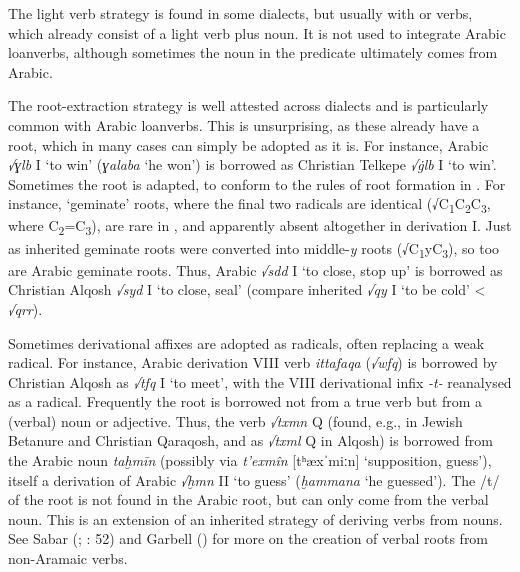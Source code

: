 \documentclass[output=paper]{langsci/langscibook}
\begin{document}
The {light verb} strategy is found in some  dialects, but usually with  or  verbs, which already consist of a {light verb} plus noun. It is not used to integrate Arabic loanverbs, although sometimes the noun in the predicate ultimately comes from Arabic.

The root-extraction strategy is well attested across  dialects and is particularly common with Arabic loanverbs. This is unsurprising, as these already have a {root}, which in many cases can simply be adopted as it is. For instance, Arabic \textit{√ɣlb} I ‘to win’ (\textit{ɣalaba} ‘he won’) is borrowed as Christian Telkepe \textit{√\.glb} I ‘to win’. Sometimes the {root} is adapted, to conform to the rules of {root} {formation} in . For instance, ‘geminate’ {roots}, where the final two radicals are identical (√C\textsubscript{1}C\textsubscript{2}C\textsubscript{3}, where C\textsubscript{2}=C\textsubscript{3}), are rare in , and apparently absent altogether in {derivation} I. Just as inherited geminate {roots} were converted into middle-\textit{y} {roots} (√C\textsubscript{1}yC\textsubscript{3}), so too are Arabic geminate {roots}. Thus, Arabic \textit{√sdd} I ‘to close, stop up’ is borrowed as Christian Alqosh \textit{√syd} I ‘to close, seal’ (compare inherited \textit{√qy{\R}} I ‘to be cold’ < \textit{√qrr}).

Sometimes {derivational} affixes are adopted as radicals, often replacing a weak radical. For instance, Arabic {derivation} VIII verb \textit{ittafaqa} (\textit{√wfq}) is borrowed by Christian Alqosh as \textit{√tfq} I ‘to meet’, with the VIII {derivational} infix \textit{\nobreakdash-t\nobreakdash-} reanalysed as a radical. Frequently the {root} is borrowed not from a true verb but from a (verbal) noun or adjective. Thus, the  verb \textit{√txmn} Q (found, e.g., in Jewish Betanure and Christian Qaraqosh, and as \textit{√txml} Q in Alqosh) is borrowed from the Arabic noun \textit{taḫmīn} (possibly via  \textit{t’exmîn} [tʰæxˈmiːn] ‘supposition, guess’), itself a {derivation} of Arabic \textit{√ḫmn} II ‘to guess’ (\textit{ḫammana} ‘he guessed’). The /t/ of the  {root} is not found in the Arabic {root}, but can only come from the verbal noun. This is an {extension} of an inherited  strategy of deriving verbs from nouns. See Sabar (\citeyear{Sabar1984}; \citeyear{Sabar2002}: 52) and Garbell (\citeyear[166]{Garbell1965}) for more on the creation of verbal {roots} from non-Aramaic verbs.
\end{document}
